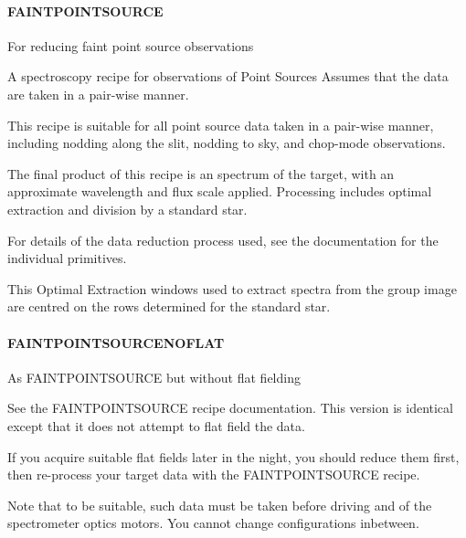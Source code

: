 \documentclass[twoside,11pt]{article}
\renewcommand{\_}{\texttt{\symbol{95}}}
\begin{document}
\paragraph{FAINT\_POINT\_SOURCE\label{FAINT_POINT_SOURCE}}

For reducing faint point source observations


\mbox{}

A spectroscopy recipe for observations of Point Sources
Assumes that the data are taken in a pair-wise manner.



This recipe is suitable for all point source data taken in a pair-wise
manner, including nodding along the slit, nodding to sky, and
chop-mode observations.



The final product of this recipe is an spectrum of the target, with an
approximate wavelength and flux scale applied. Processing includes
optimal extraction and division by a standard star.



For details of the data reduction process used, see the documentation
for the individual primitives.



This Optimal Extraction windows used to extract spectra from the group
image are centred on the rows determined for the standard star.

\paragraph{FAINT\_POINT\_SOURCE\_NOFLAT\label{FAINT_POINT_SOURCE_NOFLAT}}

As FAINT\_POINT\_SOURCE but without flat fielding


\mbox{}

See the FAINT\_POINT\_SOURCE recipe documentation. This version is
identical except that it does not attempt to flat field the data.



If you acquire suitable flat fields later in the night, you should
reduce them first, then re-process your target data with the
FAINT\_POINT\_SOURCE recipe.



Note that to be suitable, such data must be taken before driving and
of the spectrometer optics motors. You cannot change configurations
inbetween.
\end{document}
